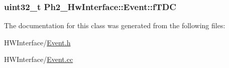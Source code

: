 \hypertarget{class_ph2___hw_interface_1_1_event_ab91638311238d12f1cd258556c8d1d80}{
\subsubsection[{f\-T\-D\-C}]{\setlength{\rightskip}{0pt plus 5cm}uint32\-\_\-t Ph2\-\_\-\-Hw\-Interface\-::\-Event\-::f\-T\-D\-C\hspace{0.3cm}{\ttfamily [private]}}}\label{class_ph2___hw_interface_1_1_event_ab91638311238d12f1cd258556c8d1d80}


The documentation for this class was generated from the following files\-:\begin{DoxyCompactItemize}
\item 
H\-W\-Interface/\hyperlink{_event_8h}{Event.\-h}\item 
H\-W\-Interface/\hyperlink{_event_8cc}{Event.\-cc}\end{DoxyCompactItemize}
